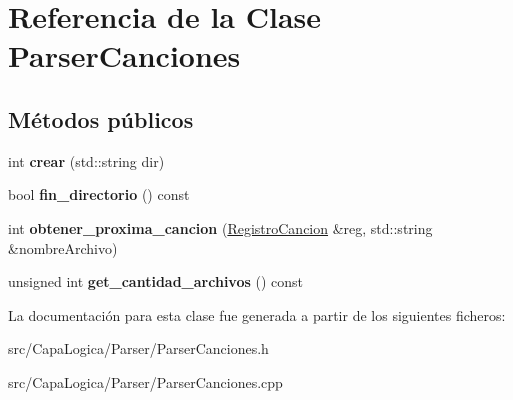 \hypertarget{class_parser_canciones}{\section{\-Referencia de la \-Clase \-Parser\-Canciones}
\label{class_parser_canciones}
}
\subsection*{\-Métodos públicos}
\begin{DoxyCompactItemize}
\item 
\hypertarget{class_parser_canciones_a99fc6dc641d18fc28befc78a756397c7}{int {\bfseries crear} (std\-::string dir)}\label{class_parser_canciones_a99fc6dc641d18fc28befc78a756397c7}

\item 
\hypertarget{class_parser_canciones_afb4c8571d6fc709336128e1f22224ab1}{bool {\bfseries fin\-\_\-directorio} () const }\label{class_parser_canciones_afb4c8571d6fc709336128e1f22224ab1}

\item 
\hypertarget{class_parser_canciones_a88a8af550367f2dda40d0a54b8d78692}{int {\bfseries obtener\-\_\-proxima\-\_\-cancion} (\hyperlink{class_registro_cancion}{\-Registro\-Cancion} \&reg, std\-::string \&nombre\-Archivo)}\label{class_parser_canciones_a88a8af550367f2dda40d0a54b8d78692}

\item 
\hypertarget{class_parser_canciones_a1818b251f457b6e833dd6fc43eab295e}{unsigned int {\bfseries get\-\_\-cantidad\-\_\-archivos} () const }\label{class_parser_canciones_a1818b251f457b6e833dd6fc43eab295e}

\end{DoxyCompactItemize}


\-La documentación para esta clase fue generada a partir de los siguientes ficheros\-:\begin{DoxyCompactItemize}
\item 
src/\-Capa\-Logica/\-Parser/\-Parser\-Canciones.\-h\item 
src/\-Capa\-Logica/\-Parser/\-Parser\-Canciones.\-cpp\end{DoxyCompactItemize}
